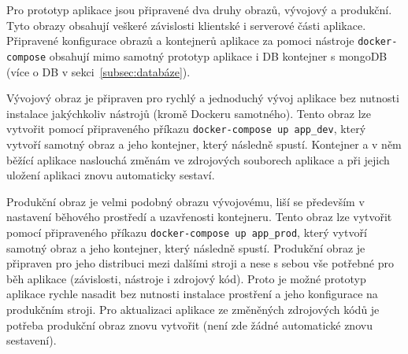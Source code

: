 Pro prototyp aplikace jsou připravené dva druhy obrazů, vývojový a produkční.
Tyto obrazy obsahují veškeré závislosti klientské i serverové části aplikace.
Připravené konfigurace obrazů a kontejnerů aplikace za pomoci nástroje \texttt{docker-compose} obsahují mimo samotný prototyp aplikace i DB kontejner s mongoDB (více o DB v sekci~\ref{subsec:databáze}).

Vývojový obraz je připraven pro rychlý a jednoduchý vývoj aplikace bez nutnosti instalace jakýchkoliv nástrojů (kromě Dockeru samotného).
Tento obraz lze vytvořit pomocí připraveného příkazu \texttt{docker-compose up app_dev}, který vytvoří samotný obraz a jeho kontejner, který následně spustí.
Kontejner a v něm běžící aplikace naslouchá změnám ve zdrojových souborech aplikace a při jejich uložení aplikaci znovu automaticky sestaví.

Produkční obraz je velmi podobný obrazu vývojovému, liší se především v nastavení běhového prostředí a uzavřenosti kontejneru.
Tento obraz lze vytvořit pomocí připraveného příkazu \texttt{docker-compose up app_prod}, který vytvoří samotný obraz a jeho kontejner, který následně spustí.
Produkční obraz je připraven pro jeho distribuci mezi dalšími stroji a nese s sebou vše potřebné pro běh aplikace (závislosti, nástroje i zdrojový kód).
Proto je možné prototyp aplikace rychle nasadit bez nutnosti instalace prostření a jeho konfigurace na produkčním stroji.
Pro aktualizaci aplikace ze změněných zdrojových kódů je potřeba produkční obraz znovu vytvořit (není zde žádné automatické znovu sestavení).
